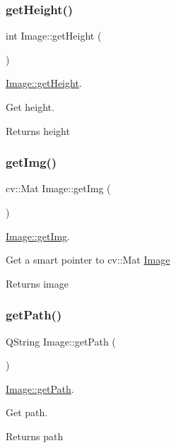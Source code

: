 \subsubsection{\texorpdfstring{getHeight()}{getHeight()}}
{\footnotesize\ttfamily int Image\+::get\+Height (\begin{DoxyParamCaption}{ }\end{DoxyParamCaption})}



\mbox{\hyperlink{class_image_aa4e1f064e5e1f3f04ad605408f1ec3af}{Image\+::get\+Height}}. 

Get height. \begin{DoxyReturn}{Returns}
height 
\end{DoxyReturn}
\mbox{\label{class_image_ad55c64e3ec01d2fb5f5568eff58abaf2}} 
\subsubsection{\texorpdfstring{getImg()}{getImg()}}
{\footnotesize\ttfamily cv\+::\+Mat Image\+::get\+Img (\begin{DoxyParamCaption}{ }\end{DoxyParamCaption})}



\mbox{\hyperlink{class_image_ad55c64e3ec01d2fb5f5568eff58abaf2}{Image\+::get\+Img}}. 

Get a smart pointer to cv\+::\+Mat \mbox{\hyperlink{class_image}{Image}} \begin{DoxyReturn}{Returns}
image 
\end{DoxyReturn}
\mbox{\label{class_image_a7bf2bf3762aedf13b9a2fe924c2adb67}} 
\subsubsection{\texorpdfstring{getPath()}{getPath()}}
{\footnotesize\ttfamily Q\+String Image\+::get\+Path (\begin{DoxyParamCaption}{ }\end{DoxyParamCaption})}



\mbox{\hyperlink{class_image_a7bf2bf3762aedf13b9a2fe924c2adb67}{Image\+::get\+Path}}. 

Get path. \begin{DoxyReturn}{Returns}
path 
\end{DoxyReturn}
\mbox{\label{class_image_af2720a072812763395512fc3c8c21362}} 
